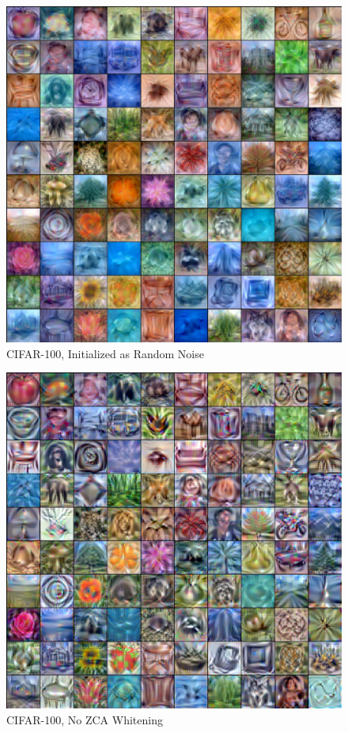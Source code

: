 \documentclass[main.tex]{subfiles}
\begin{document}
\begin{figure}
    \centering
    \includegraphics[width=\linewidth]{figures/cifar100-noise.pdf}
    \caption{CIFAR-100, Initialized as Random Noise}
    \label{fig:noise}
\end{figure}
\begin{figure}
    \centering
    \includegraphics[width=\linewidth]{figures/cifar100-nozca.pdf}
    \caption{CIFAR-100, No ZCA Whitening}
    \label{fig:nozca}
\end{figure}
\end{document}
